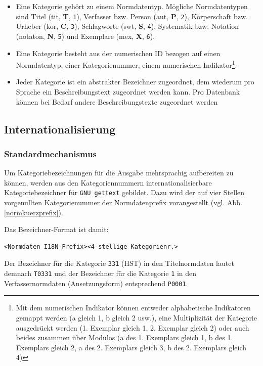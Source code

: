 \documentclass[11pt, twoside, a4paper, BCOR8mm, DIV12, bibtotoc,idxtotoc]{scrbook}
\begin{document}
\begin{itemize}
\item Eine Kategorie gehört zu einem Normdatentyp. Mögliche
  Normdatentypen sind Titel (tit, \textbf{T}, \texttt{1}), Verfasser
  bzw. Person (aut, \textbf{P}, \texttt{2}), Körperschaft bzw. Urheber
  (kor, \textbf{C}, \texttt{3}), Schlagworte (swt, \textbf{S},
  \texttt{4}), Systematik bzw. Notation (notaton, \textbf{N},
  \texttt{5}) und Exemplare (mex, \textbf{X}, \texttt{6}).
\item Eine Kategorie besteht aus der numerischen ID bezogen auf einen
  Normdatentyp, einer Kategorienummer, einem numerischen
  Indikator\footnote{Mit dem numerischen Indikator können entweder
    alphabetische Indikatoren gemappt werden (a gleich 1, b gleich 2
    usw.), eine Multiplizität der Kategorie ausgedrückt werden (1.
    Exemplar gleich 1, 2. Exemplar gleich 2) oder auch beides zusammen
    über Modulos (a des 1. Exemplars gleich 1, b des 1. Exemplars
    gleich 2, a des 2. Exemplars gleich 3, b des 2. Exemplars gleich
    4)}.
\item Jeder Kategorie ist ein abstrakter Bezeichner zugeordnet, dem
  wiederum pro Sprache ein Beschreibungstext zugeordnet werden
  kann. Pro Datenbank können bei Bedarf andere Beschreibungstexte
  zugeordnet werden
\end{itemize}


\subsection{Internationalisierung}


\subsubsection{Standardmechanismus}

Um Kategoriebezeichnungen für die Ausgabe mehrsprachig aufbereiten zu
können, werden aus den Kategoriennummern internationalisierbare
Kategoriebezeichner für \texttt{GNU gettext} gebildet. Dazu wird der
auf vier Stellen vorgenullten Kategorienummer der Normdatenprefix
vorangestellt (vgl. Abb. \ref{normkuerzprefix}).

Das Bezeichner-Format ist damit:

\begin{verbatim}
<Normdaten I18N-Prefix><4-stellige Kategorienr.>
\end{verbatim}

Der Bezeichner für die Kategorie \texttt{331} (HST) in den Titelnormdaten
lautet demnach \texttt{T0331} und der Bezeichner für die Kategorie
\texttt{1} in den Verfassernormdaten (Ansetzungsform) entsprechend
\texttt{P0001}.
\end{document}
